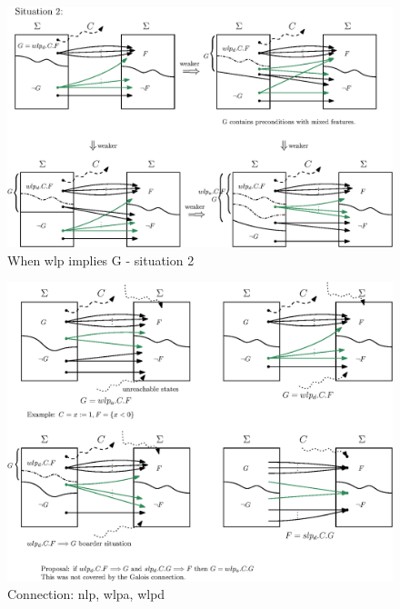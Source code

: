 \begin{figure}[ht!]\centering
\includegraphics[width=\textwidth]{image/wlp-g-2.eps}
\caption{When wlp implies G - situation 2}
\label{fig:wlp-g-2}
\end{figure}


\begin{figure}[ht!]\centering
\includegraphics[width=\textwidth]{image/wlp-g-boarder.eps}
\caption{Connection: nlp, wlpa, wlpd}
\label{fig:wlp-g-2}
\end{figure}

